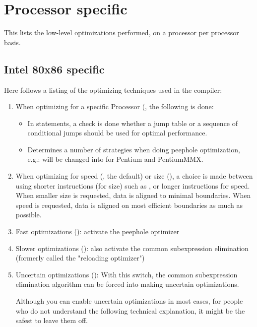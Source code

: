 \section{Processor specific}

This lists the low-level optimizations performed, on a processor
per processor basis.

\subsection{Intel 80x86 specific}

Here follows a listing of the optimizing techniques used in the compiler:
\begin{enumerate}
\item When optimizing for a specific Processor (,
the following is done:
\begin{itemize}
\item In  statements, a check is done whether a jump table
or a sequence of conditional jumps should be used for optimal performance.
\item Determines a number of strategies when doing peephole optimization, e.g.:
 will be changed into
 for Pentium and PentiumMMX.
\end{itemize}
\item When optimizing for speed (, the default) or size (), a choice is
made between using shorter instructions (for size) such as ,
or longer instructions  for speed. When smaller size is
requested, data is aligned to minimal boundaries.  When speed is
requested, data is aligned on most efficient boundaries as much as possible.
\item Fast optimizations (): activate the peephole optimizer
\item Slower optimizations (): also activate the common subexpression
elimination (formerly called the "reloading optimizer")
\item Uncertain optimizations (): With this switch, the common subexpression
elimination algorithm can be forced into making uncertain optimizations.

Although you can enable uncertain optimizations in most cases, for people who
do not understand the following technical explanation, it might be the safest to
leave them off.


\end{enumerate}

